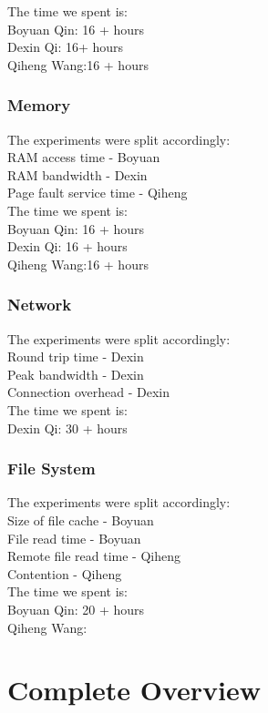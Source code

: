 \documentclass{article} %
\begin{document}
The time we spent is:\\
Boyuan Qin: 16 + hours\\
Dexin Qi: 16+ hours\\
Qiheng Wang:16 + hours

\subsubsection{Memory}
The experiments were split accordingly:\\
RAM access time - Boyuan\\
RAM bandwidth - Dexin\\
Page fault service time - Qiheng\\

The time we spent is:\\
Boyuan Qin: 16 + hours\\
Dexin Qi: 16 + hours\\
Qiheng Wang:16 + hours

\subsubsection{Network}
The experiments were split accordingly:\\
Round trip time - Dexin\\
Peak bandwidth - Dexin\\
Connection overhead - Dexin\\

The time we spent is:\\
Dexin Qi: 30 + hours\\
\subsubsection{File System}
The experiments were split accordingly:\\
Size of file cache - Boyuan\\
File read time - Boyuan\\
Remote file read time - Qiheng \\
Contention - Qiheng\\

The time we spent is:\\
Boyuan Qin: 20 + hours\\
Qiheng Wang:

\section{Complete Overview}
\end{document}
